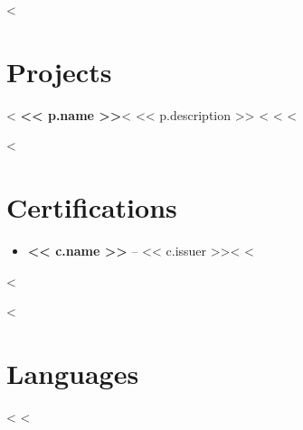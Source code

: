 \documentclass[11pt,a4paper]{article}
\begin{document}
<%
\section*{Projects}
<%
\textbf{<< p.name >>}<%
<< p.description >>
<%
\vspace{4pt}
<%
<%

<%
\section*{Certifications}
\begin{itemize}
<%
    \item \textbf{<< c.name >>} -- << c.issuer >><%
<%
\end{itemize}
<%

<%
\section*{Languages}
<%
<%
\end{document}
